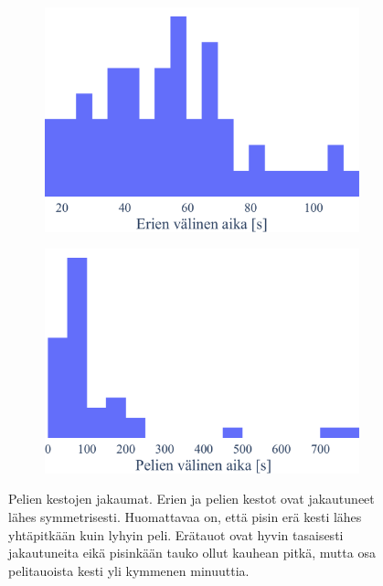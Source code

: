 \begin{figure}[!ht]
\begin{subfigure}[b]{0.4\textwidth}
           \includegraphics[width=\textwidth]{figures/pelit3.pdf}
       \end{subfigure}
       \hfill
       \begin{subfigure}[b]{0.4\textwidth}
           \centering
           \includegraphics[width=\textwidth]{figures/pelit4.pdf}
       \end{subfigure}
       \caption{
        Pelien kestojen jakaumat.
        Erien ja pelien kestot ovat jakautuneet lähes symmetrisesti.
        Huomattavaa on, että pisin erä kesti lähes yhtäpitkään kuin lyhyin peli.
        Erätauot ovat hyvin tasaisesti jakautuneita eikä pisinkään tauko ollut kauhean pitkä,
        mutta osa pelitauoista kesti yli kymmenen minuuttia.\label{fig:games}
        }
    \end{figure}

